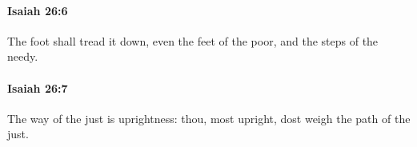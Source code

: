 		\paragraph{Isaiah 26:6} %
			\label{ISAIAH-26-6}

			The foot shall tread it down, even the feet of the poor, and the steps of the needy.


		\paragraph{Isaiah 26:7} %
			\label{ISAIAH-26-7}

			The way of the just is uprightness: thou, most upright, dost weigh the path of the just.



